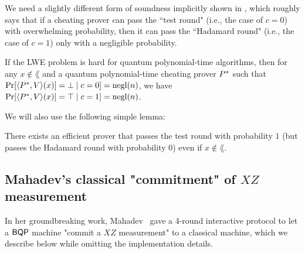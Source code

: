 We need a slightly different form of soundness implicitly shown in \cite{FOCS:Mahadev18a}, which roughly says that if a cheating prover can pass the ``test round" (i.e., the case of $c=0$) with overwhelming probability, then it can pass the ``Hadamard round" (i.e., the case of $c=1$) only with a negligible probability. 
\begin{lemma}\label{lem:Mah_soundness}
If the LWE problem is hard for quantum polynomial-time algorithms, then for any $x\notin \lang$ and a quantum polynomial-time cheating prover $P^*$ such that  $\Pr[\langle P^*,V \rangle(x)]=\bot\mid c=0]=\operatorname{negl}(n)$, we have $\Pr[\langle P^*,V \rangle(x)]=\top\mid c=1]=\operatorname{negl}(n)$.
\end{lemma}

We will also use the following simple lemma:
\begin{lemma}\label{fact:perfectly_pass_test}
There exists an efficient prover that passes the test round with probability $1$ (but passes the Hadamard round with probability $0$) even if $x\notin \lang$. 
\end{lemma}


\subsection{Mahadev's classical "commitment" of $XZ$ measurement}

In her groundbreaking work, Mahadev~\cite{FOCS:Mahadev18a} gave a 4-round interactive protocol to let a $\operatorname{\mathsf{BQP}}$ machine "commit a $XZ$ measurement" to a classical machine, which we describe below while omitting the implementation details. 

